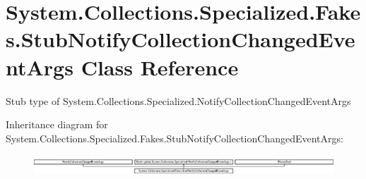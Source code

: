 \hypertarget{class_system_1_1_collections_1_1_specialized_1_1_fakes_1_1_stub_notify_collection_changed_event_args}{\section{System.\-Collections.\-Specialized.\-Fakes.\-Stub\-Notify\-Collection\-Changed\-Event\-Args Class Reference}
\label{class_system_1_1_collections_1_1_specialized_1_1_fakes_1_1_stub_notify_collection_changed_event_args}
}


Stub type of System.\-Collections.\-Specialized.\-Notify\-Collection\-Changed\-Event\-Args 


Inheritance diagram for System.\-Collections.\-Specialized.\-Fakes.\-Stub\-Notify\-Collection\-Changed\-Event\-Args\-:\begin{figure}[H]
\begin{center}
\leavevmode
\includegraphics[height=0.765027cm]{class_system_1_1_collections_1_1_specialized_1_1_fakes_1_1_stub_notify_collection_changed_event_args}
\end{center}
\end{figure}
